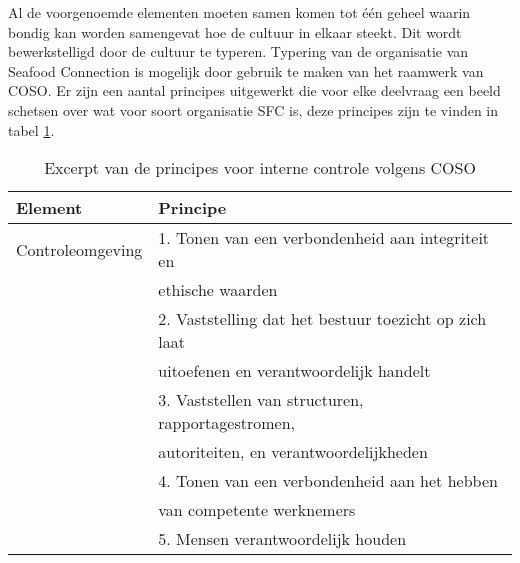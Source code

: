Al de voorgenoemde elementen moeten samen komen tot één geheel waarin bondig kan worden samengevat hoe de cultuur in elkaar steekt. Dit wordt bewerkstelligd door de cultuur te typeren. Typering van de organisatie van Seafood Connection is mogelijk door gebruik te maken van het raamwerk van COSO. Er zijn een aantal principes uitgewerkt die voor elke deelvraag een beeld schetsen over wat voor soort organisatie SFC is, deze principes zijn te vinden in tabel \ref{tab:controleprincipes}.

\begin{table}[h]
    \centering
    \caption{Excerpt van de principes voor interne controle volgens COSO}
    \begin{tabular}{l l}
        \toprule
        \textbf{Element} & \textbf{Principe} \\
        \midrule
        Controleomgeving & 1. Tonen van een verbondenheid aan integriteit en \\
         & ethische waarden \\
         & 2. Vaststelling dat het bestuur toezicht op zich laat \\
         & uitoefenen en verantwoordelijk handelt \\
         & 3. Vaststellen van structuren, rapportagestromen, \\
         & autoriteiten, en verantwoordelijkheden \\
         & 4. Tonen van een verbondenheid aan het hebben \\
         & van competente werknemers \\
         & 5. Mensen verantwoordelijk houden \\
        \bottomrule
    \end{tabular}
    \label{tab:controleprincipes}
\end{table}

